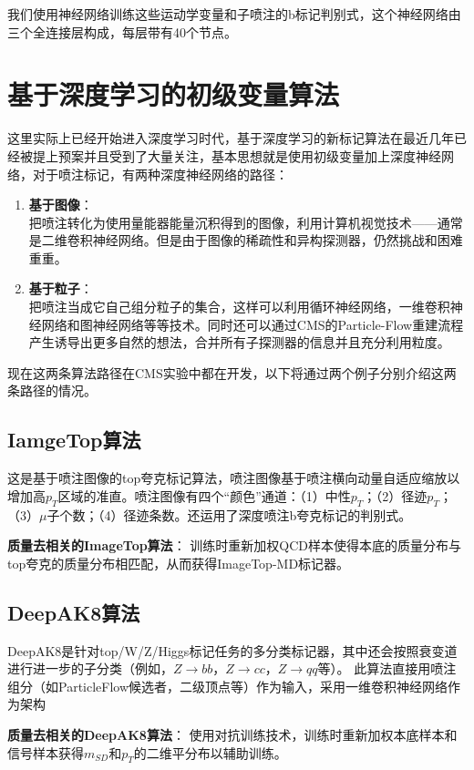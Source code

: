 我们使用神经网络训练这些运动学变量和子喷注的b标记判别式，这个神经网络由三个全连接层构成，每层带有40个节点。
\section{基于深度学习的初级变量算法}
这里实际上已经开始进入深度学习时代，基于深度学习的新标记算法在最近几年已经被提上预案并且受到了大量关注，基本思想就是使用初级变量加上深度神经网络，对于喷注标记，有两种深度神经网络的路径：
\begin{enumerate}[1.]
    \item \textbf{基于图像}：\label{dl:image}\\
    把喷注转化为使用量能器能量沉积得到的图像，利用计算机视觉技术——通常是二维卷积神经网络。但是由于图像的稀疏性和异构探测器，仍然挑战和困难重重。
    \item \textbf{基于粒子}：\label{dl:particle}\\
    把喷注当成它自己组分粒子的集合，这样可以利用循环神经网络，一维卷积神经网络和图神经网络等等技术。同时还可以通过CMS的Particle-Flow重建流程产生诱导出更多自然的想法，合并所有子探测器的信息并且充分利用粒度。
\end{enumerate}

现在这两条算法路径在CMS实验中都在开发，以下将通过两个例子分别介绍这两条路径的情况。
\subsection{IamgeTop算法}
这是基于喷注图像的top夸克标记算法，喷注图像基于喷注横向动量自适应缩放以
增加高$p_T$区域的准直。喷注图像有四个“颜色”通道：（1）中性$p_T$；（2）径迹$p_T$；（3）$\mu$子个数；（4）径迹条数。还运用了深度喷注b夸克标记的判别式。

\textbf{质量去相关的ImageTop算法}：
训练时重新加权QCD样本使得本底的质量分布与top夸克的质量分布相匹配，从而获得ImageTop-MD标记器。
\subsection{DeepAK8算法}
DeepAK8是针对top/W/Z/Higgs标记任务的多分类标记器，其中还会按照衰变道进行进一步的子分类（例如，$Z\to bb$，$Z\to cc$，$Z\to qq$等）。
此算法直接用喷注组分（如ParticleFlow候选者，二级顶点等）作为输入，采用一维卷积神经网络作为架构

\textbf{质量去相关的DeepAK8算法}：
使用对抗训练技术，训练时重新加权本底样本和信号样本获得$m_{SD}$和$p_T$的二维平分布以辅助训练。